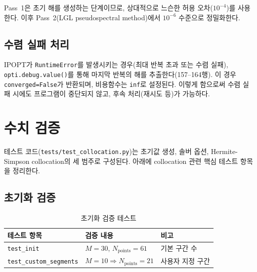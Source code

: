 \documentclass[11pt]{article}
\begin{document}
Pass~1은 초기 해를 생성하는 단계이므로, 상대적으로 느슨한 허용 오차($10^{-4}$)를 사용한다. 이후 Pass~2(LGL pseudospectral method)에서 $10^{-6}$ 수준으로 정밀화한다.


\subsection{수렴 실패 처리}
\label{sec:convergence-failure}

IPOPT가 \texttt{RuntimeError}를 발생시키는 경우(최대 반복 초과 또는 수렴 실패), \texttt{opti.debug.value()}를 통해 마지막 반복의 해를 추출한다(157--164행). 이 경우 \texttt{converged=False}가 반환되며, 비용함수는 \texttt{inf}로 설정된다. 이렇게 함으로써 수렴 실패 시에도 프로그램이 중단되지 않고, 후속 처리(재시도 등)가 가능하다.


\section{수치 검증}
\label{sec:verification}

테스트 코드(\texttt{tests/test\_collocation.py})는 초기값 생성, 솔버 옵션, Hermite-Simpson collocation의 세 범주로 구성된다. 아래에 collocation 관련 핵심 테스트 항목을 정리한다.


\subsection{초기화 검증}
\label{sec:init-test}

\begin{table}[htbp]
\centering
\caption{초기화 검증 테스트}
\label{tab:init-test}
\begin{tabular}{@{}lll@{}}
\toprule
테스트 항목 & 검증 내용 & 비고 \\
\midrule
\texttt{test\_init} & $M = 30$, $N_{\text{points}} = 61$ & 기본 구간 수 \\
\texttt{test\_custom\_segments} & $M = 10 \Rightarrow N_{\text{points}} = 21$ & 사용자 지정 구간 \\
\bottomrule
\end{tabular}
\end{table}
\end{document}
